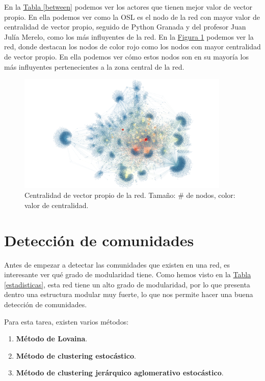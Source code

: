 \documentclass[paper=a4, fontsize=11pt]{article} %
\numberwithin{equation}{section} %
\numberwithin{figure}{section} %
\numberwithin{table}{section} %
\begin{document}
En la \hyperref[between]{Tabla \ref*{between}} podemos ver los actores que tienen mejor valor de vector propio. En ella podemos ver como la OSL es el nodo de la red con mayor valor de centralidad de vector propio, seguido de Python Granada y del profesor Juan Julía Merelo, como los más influyentes de la red. En la \hyperref[im6]{Figura \ref*{im6}} podemos ver la red, donde destacan los nodos de color rojo como los nodos con mayor centralidad de vector propio. En ella podemos ver cómo estos nodos son en su mayoría los más influyentes pertenecientes a la zona central de la red.

\begin{figure}[H]
  \centering
  \includegraphics[width=0.9\textwidth]{../Visualizaciones/eigenvec}
  \caption{Centralidad de vector propio de la red. Tamaño: \# de nodos, color: valor de centralidad.}
  \label{im6}
\end{figure}

\section{Detección de comunidades}

Antes de empezar a detectar las comunidades que existen en una red, es interesante ver qué grado de modularidad tiene. Como hemos visto en la \hyperref[estadisticas]{Tabla \ref*{estadisticas}}, esta red tiene un alto grado de modularidad, por lo que presenta dentro una estructura modular muy fuerte, lo que nos permite hacer una buena detección de comunidades.

Para esta tarea, existen varios métodos:

\begin{enumerate}[$\bullet$]
  \item \textbf{Método de Lovaina}.
  \item \textbf{Método de clustering estocástico}.
  \item \textbf{Método de clustering jerárquico aglomerativo estocástico}.
\end{enumerate}
\end{document}
